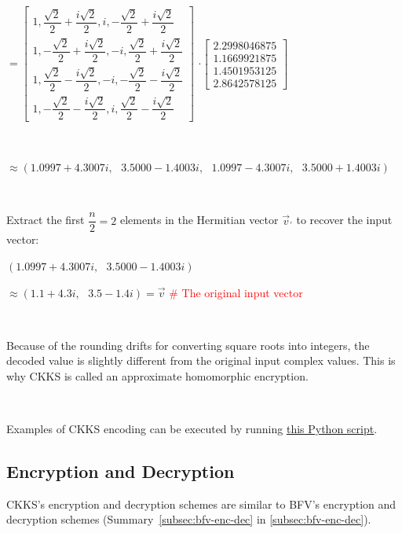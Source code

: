 $= 
\begin{bmatrix}
1,\dfrac{\sqrt{2}}{2} + \dfrac{i\sqrt{2}}{2},i, -\dfrac{\sqrt{2}}{2} + \dfrac{i\sqrt{2}}{2}\\
1,-\dfrac{\sqrt{2}}{2} + \dfrac{i\sqrt{2}}{2}, -i,\dfrac{\sqrt{2}}{2} + \dfrac{i\sqrt{2}}{2}\\
1,\dfrac{\sqrt{2}}{2} - \dfrac{i\sqrt{2}}{2}, -i, -\dfrac{\sqrt{2}}{2} - \dfrac{i\sqrt{2}}{2}\\
1,-\dfrac{\sqrt{2}}{2} - \dfrac{i\sqrt{2}}{2}, i, \dfrac{\sqrt{2}}{2} - \dfrac{i\sqrt{2}}{2}
\end{bmatrix}$
$\cdot \begin{bmatrix}
2.2998046875\\1.1669921875\\1.4501953125\\2.8642578125
\end{bmatrix}$

$ $

$ \approx (1.0997+4.3007i, \text{ } 3.5000-1.4003i, \text{ } 1.0997-4.3007i, \text{ } 3.5000+1.4003i)$

$ $

Extract the first $\dfrac{n}{2} = 2$ elements in the Hermitian vector $\vec{v}_{'}$ to recover the input vector:

$(1.0997+4.3007i, \text{ } 3.5000-1.4003i)$

$\approx (1.1 + 4.3i, \text{ } 3.5 - 1.4i) = \vec{v}$ \textcolor{red}{\text{ } \# The original input vector}

$ $

Because of the rounding drifts for converting square roots into integers, the decoded value is slightly different from the original input complex values. This is why CKKS is called an approximate homomorphic encryption.

$ $

 Examples of CKKS encoding can be executed by running \href{https://github.com/gogo9th/fhe-textbook/blob/main/soruce%20code/ckks.py}{\underline{this Python script}}. 



\subsection{Encryption and Decryption}
\label{subsec:ckks-enc-dec}

CKKS's encryption and decryption schemes are similar to BFV's encryption and decryption schemes (Summary~\ref*{subsec:bfv-enc-dec} in \autoref{subsec:bfv-enc-dec}). 



